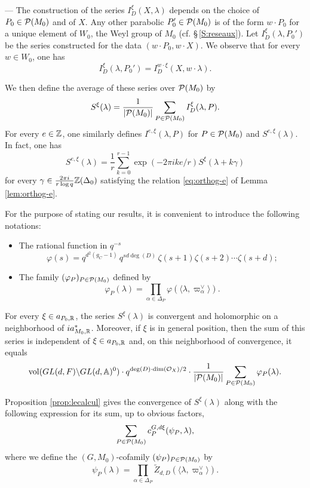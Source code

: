\begin{paragr}
\begin{paragr} ---
The construction of the series $I^{\xi}_D(X,\lambda)$ depends on the choice of $P_0\in \mathcal{P}(M_0)$ and of $X$. Any other parabolic $P_0'\in \mathcal{P}(M_0)$ is of the form $w\cdot P_0$ for a unique element of $W_0$, the Weyl group of $M_0$ (cf. \S\,\ref{S:reseaux}). Let $I^{\xi}_D(\lambda, P_0')$ be the series constructed for the data $(w\cdot P_0,w\cdot X)$. We observe that for every $w\in W_0$, one has 
$$I^{\xi}_D(\lambda, P_0')=I^{w\cdot \xi}_D(X,w\cdot \lambda).$$

We then define the average of these series over $\mathcal{P}(M_0)$ by
$$S^{\xi}(\lambda)=\frac{1}{|\mathcal{P}(M_0)|}\sum_{P\in \mathcal{P}(M_0)} I^{\xi}_D(\lambda, P).$$
For every $e\in \mathbb{Z}$, one similarly defines $I^{e,\xi}(\lambda, P)$ for $P\in \mathcal{P}(M_0)$ and $S^{e,\xi}(\lambda)$. In fact, one has
\begin{equation}
  \label{eq:Sexi}
  S^{e,\xi}(\lambda)= \frac1r \sum_{k=0}^{r-1}   \exp(-2\pi i k e/r)S^{\xi}(\lambda+k\gamma)
\end{equation}
for every $\gamma\in \frac{2\pi i }{r \log q } \mathbb{Z}(\Delta_0)$ satisfying the relation \eqref{eq:orthog-e} of Lemma \ref{lem:orthog-e}.

For the purpose of stating our results, it is convenient to introduce the following notations:
\begin{itemize}
\item The rational function in $q^{-s}$
$$\varphi(s)=  q^{d^2(g_C-1)} \, q^{sd\deg(D)}\, \zeta(s+1)\zeta(s+2)\cdots \zeta(s+d);$$
\item The family $(\varphi_{P})_{P\in \mathcal{P}(M_0)}$ defined by
$$\varphi_P(\lambda)=  \prod_{\alpha\in \Delta_P} \varphi(\langle \lambda, \varpi_\alpha^\vee\rangle).$$
\end{itemize}

\begin{proposition}\label{cor:sommezeta}
For every $\xi\in a_{P_0,\mathbb{R}}$, the series $S^{\xi}(\lambda)$ is convergent and holomorphic on a neighborhood of $ia^*_{M_0,\mathbb{R}}$. Moreover, if $\xi$ is in general position, then the sum of this series is independent of $\xi\in a_{P_0,\mathbb{R}}$ and, on this neighborhood of convergence, it equals 
$$ \operatorname{vol}(GL(d,F)\backslash GL(d,\mathbb{A})^0) \cdot q^{\deg(D)\cdot  \dim(\mathcal{O}_X)/2}\cdot \frac{1}{|\mathcal{P}(M_0)|} \sum_{P\in \mathcal{P}(M_0)} \varphi_P(\lambda).$$
\end{proposition}

\begin{preuve}
Proposition \ref{prop:lecalcul} gives the convergence of $S^{\xi}(\lambda)$ along with the following expression for its sum, up to obvious factors,
$$\sum_{P\in \mathcal{P}(M_0)}c_{P}^{G,d \xi}(\psi_P,\lambda),$$
where we define the $(G,M_0)$-cofamily $(\psi_P)_{P\in \mathcal{P}(M_0)}$ by
$$\psi_P(\lambda)=\prod_{\alpha\in \Delta_P}\tilde{Z}_{d,D}(\langle \lambda, \varpi_\alpha^\vee\rangle).$$


\end{preuve}
\end{paragr}
\end{paragr}
